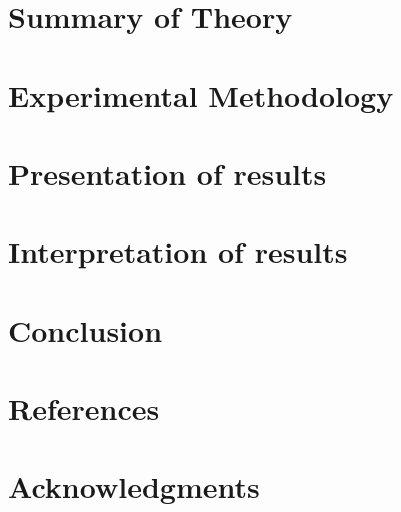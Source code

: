 \documentclass[12pt,a4paper,titlepage]{article}
\begin{document}
\section{Summary of Theory}

\section{Experimental Methodology}

\section{Presentation of results}

\section{Interpretation of results}

\section{Conclusion}

\section{References}

\section{Acknowledgments}
\end{document}
